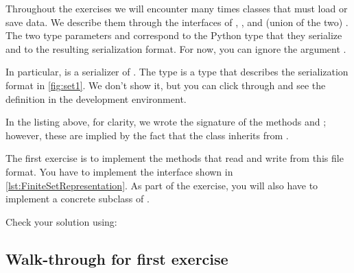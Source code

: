 Throughout the exercises we will encounter many times classes that must load or save data.
We describe them through the interfaces of , , and (union of the two) .
The two type parameters  and  correspond to the Python type that they serialize and to the resulting serialization format.
For now, you can ignore the argument .


In particular,  is a serializer of .
The type  is a type that describes the serialization format in \cref{fig:set1}.
We don't show it, but you can click through and see the definition in the development environment.


In the listing above, for clarity, we wrote the signature of the methods  and ;
however, these are implied by the fact that the class inherits from .

\begin{codeexercise}
    \label{ex:setrepr}
    The first exercise is to implement the methods that read and write from this file format.
    You have to implement the interface \FiniteSetRepresentation shown in \cref{lst:FiniteSetRepresentation}.
    As part of the exercise, you will also have to implement a concrete subclass of \FiniteSet.

    Check your solution using:


\end{codeexercise}



\subsection{Walk-through for first exercise}

